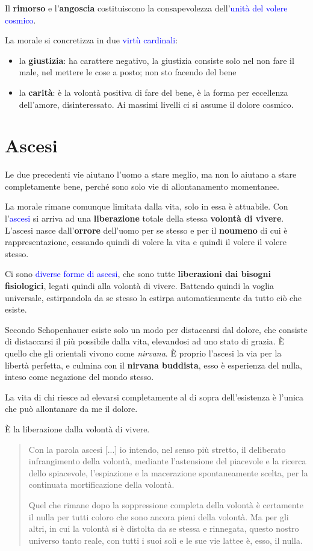 \documentclass[a4paper, twoside, titlepage]{book}
\newcommand{\citazione}[1]{%
  \begin{quotation}
  #1
  \end{quotation}}
\renewcommand{\emph}[1]{\textcolor{blue}{#1}}
\begin{document}
Il \textbf{rimorso} e l’\textbf{angoscia} costituiscono la consapevolezza dell’\emph{unità del volere cosmico}.

La morale si concretizza in due \emph{virtù cardinali}:
\begin{itemize}
\item la \textbf{giustizia}: ha carattere negativo, la giustizia consiste solo nel non fare il male, nel mettere le cose a posto; non sto facendo del bene
\item la \textbf{carità}: è la volontà positiva di fare del bene, è la forma per eccellenza dell’amore, disinteressato. Ai massimi livelli ci si assume il dolore cosmico.
\end{itemize}

\section{Ascesi}

Le due precedenti vie aiutano l'uomo a stare meglio, ma non lo aiutano a stare completamente bene, perché sono solo vie di allontanamento momentanee.

La morale rimane comunque limitata dalla vita, solo in essa è attuabile. Con l’\emph{ascesi} si arriva ad una \textbf{liberazione} totale della stessa \textbf{volontà di vivere}. L’ascesi nasce dall’\textbf{orrore} dell’uomo per se stesso e per il \textbf{noumeno} di cui è rappresentazione, cessando quindi di volere la vita e quindi il volere il volere stesso.

Ci sono \emph{diverse forme di ascesi}, che sono tutte \textbf{liberazioni dai bisogni fisiologici}, legati quindi alla volontà di vivere. Battendo quindi la voglia universale, estirpandola da se stesso la estirpa automaticamente da tutto ciò che esiste.

Secondo Schopenhauer esiste solo un modo per distaccarsi dal dolore, che consiste di distaccarsi il più possibile dalla vita, elevandosi ad uno stato di grazia. È quello che gli orientali vivono come \textit{nirvana}.
È proprio l’ascesi la via per la libertà perfetta, e culmina con il \textbf{nirvana buddista}, esso è esperienza del nulla, inteso come negazione del mondo stesso.

La vita di chi riesce ad elevarsi completamente al di sopra dell'esistenza è l'unica che può allontanare da me il dolore.

È la liberazione dalla volontà di vivere.

\citazione{Con la parola ascesi [...] io intendo, nel senso più stretto, il deliberato infrangimento della volontà, mediante l'astensione del piacevole e la ricerca dello spiacevole, l'espiazione e la macerazione spontaneamente scelta, per la continuata mortificazione della volontà.

Quel che rimane dopo la soppressione completa della volontà è certamente il nulla per tutti coloro che sono ancora pieni della volontà. Ma per gli altri, in cui la volontà si è distolta da se stessa e rinnegata, questo nostro universo tanto reale, con tutti i suoi soli e le sue vie lattee è, esso, il nulla.}
\end{document}
